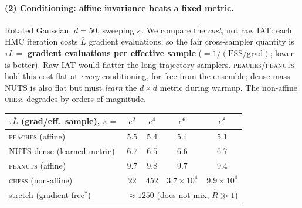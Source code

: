 \documentclass[11pt]{article}
\begin{document}
\paragraph{(2) Conditioning: affine invariance beats a fixed metric.}
\label{sec:cond}
Rotated Gaussian, $d{=}50$, sweeping $\kappa$. We compare the \emph{cost}, not
raw IAT: each HMC iteration costs $\bar L$ gradient evaluations, so the fair
cross-sampler quantity is $\tau\bar L=$ \textbf{gradient evaluations per
effective sample} ($=1/(\text{ESS}/\text{grad})$; lower is better). Raw IAT
would flatter the long-trajectory samplers. \textsc{peaches}/\textsc{peanuts}
hold this cost flat at \emph{every} conditioning, for free from the ensemble;
dense-mass NUTS is also flat but must \emph{learn} the $d{\times}d$ metric
during warmup. The non-affine \textsc{chess} degrades by orders of magnitude.
\begin{center}\small
\begin{tabular}{l cccc}
\toprule
$\tau\bar L$ (grad/eff.\ sample), $\kappa=$ & $e^2$ & $e^4$ & $e^6$ & $e^8$\\
\midrule
\textsc{peaches} (affine)        & $5.5$  & $5.4$  & $5.4$    & $5.1$\\
NUTS-dense (learned metric)      & $6.7$  & $6.5$  & $6.6$    & $6.7$\\
\textsc{peanuts} (affine)        & $9.7$  & $9.8$  & $9.7$    & $9.4$\\
\textsc{chess} (non-affine)      & $22$   & $452$  & $3.7\!\times\!10^4$ & $9.9\!\times\!10^4$\\
stretch (gradient-free$^{\ast}$) & \multicolumn{4}{c}{$\approx\!1250$ (does not mix, $\hat R\!\gg\!1$)}\\
\bottomrule
\end{tabular}
\end{center}
\end{document}
